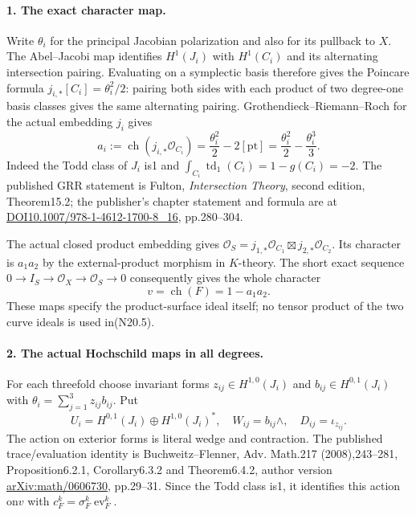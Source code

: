 \paragraph{1. The exact character map.}
Write $\theta_i$ for the principal Jacobian polarization and also
for its pullback to $X$. The Abel--Jacobi map identifies
$H^1(J_i)$ with $H^1(C_i)$ and its alternating intersection pairing.
Evaluating on a symplectic basis therefore gives the Poincare formula
$j_{i,*}[C_i]=\theta_i^2/2$: pairing both sides with each product
of two degree-one basis classes gives the same alternating pairing.
Grothendieck--Riemann--Roch for the actual embedding $j_i$ gives
\[
 a_i:=\operatorname{ch}(j_{i,*}\mathcal O_{C_i})
       =\frac{\theta_i^2}{2}-2[\mathrm{pt}]
       =\frac{\theta_i^2}{2}-\frac{\theta_i^3}{3}.               \tag{N20.4}
\]
Indeed the Todd class of $J_i$ is1 and
$\int_{C_i}\operatorname{td}_1(C_i)=1-g(C_i)=-2$.
The published GRR statement is Fulton, \emph{Intersection Theory},
second edition, Theorem15.2; the publisher's chapter statement
and formula are at
\href{https://doi.org/10.1007/978-1-4612-1700-8_16}
{DOI10.1007/978-1-4612-1700-8\_16}, pp.280--304.

The actual closed product embedding gives
$\mathcal O_S=j_{1,*}\mathcal O_{C_1}\boxtimes
j_{2,*}\mathcal O_{C_2}$. Its character is $a_1a_2$ by the
external-product morphism in $K$-theory. The short exact sequence
$0\to I_S\to\mathcal O_X\to\mathcal O_S\to0$ consequently gives
the whole character
\[
                         v=\operatorname{ch}(F)=1-a_1a_2.     \tag{N20.5}
\]
These maps specify the product-surface ideal itself; no tensor
product of the two curve ideals is used in(N20.5).

\paragraph{2. The actual Hochschild maps in all degrees.}
For each threefold choose invariant forms
$z_{ij}\in H^{1,0}(J_i)$ and $b_{ij}\in H^{0,1}(J_i)$ with
$\theta_i=\sum_{j=1}^3 z_{ij}b_{ij}$. Put
\[
 U_i=H^{0,1}(J_i)\oplus H^{1,0}(J_i)^*,\quad
 W_{ij}=b_{ij}\wedge,\quad D_{ij}=\iota_{z_{ij}}.
\]
The action on exterior forms is literal wedge and contraction.
The published trace/evaluation identity is Buchweitz--Flenner,
Adv. Math.217 (2008),243--281, Proposition6.2.1,
Corollary6.3.2 and Theorem6.4.2, author version
\href{https://arxiv.org/pdf/math/0606730}{arXiv:math/0606730},
pp.29--31. Since the Todd class is1, it identifies this action
on$v$ with $c_F^k=\sigma_F^k\operatorname{ev}_F^k$.

